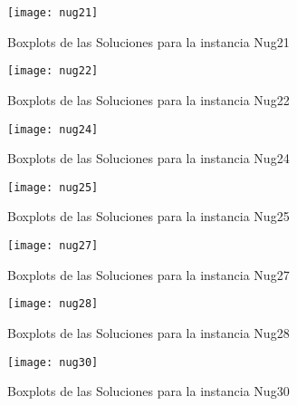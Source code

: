 \documentclass{ci5652}
\begin{document}
\begin{figure}[ht]
	\caption{Boxplots de las Soluciones para la instancia Nug21}
	\texttt{[image: nug21]}
    \centering
    \label{fig:boxplot_nug21}
\end{figure}

\begin{figure}[ht]
	\caption{Boxplots de las Soluciones para la instancia Nug22}
	\texttt{[image: nug22]}
    \centering
    \label{fig:boxplot_nug22}
\end{figure}

\begin{figure}[ht]
	\caption{Boxplots de las Soluciones para la instancia Nug24}
	\texttt{[image: nug24]}
    \centering
    \label{fig:boxplot_nug24}
\end{figure}

\begin{figure}[ht]
	\caption{Boxplots de las Soluciones para la instancia Nug25}
	\texttt{[image: nug25]}
    \centering
    \label{fig:boxplot_nug25}
\end{figure}

\begin{figure}[ht]
	\caption{Boxplots de las Soluciones para la instancia Nug27}
	\texttt{[image: nug27]}
    \centering
    \label{fig:boxplot_nug27}
\end{figure}

\begin{figure}[ht]
	\caption{Boxplots de las Soluciones para la instancia Nug28}
	\texttt{[image: nug28]}
    \centering
    \label{fig:boxplot_nug28}
\end{figure}

\begin{figure}[ht]
	\caption{Boxplots de las Soluciones para la instancia Nug30}
	\texttt{[image: nug30]}
    \centering
    \label{fig:boxplot_nug30}
\end{figure}

%
\end{document}
